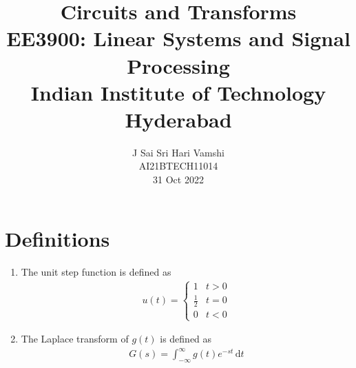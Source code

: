 \documentclass[journal,12pt,twocolumn]{IEEEtran}
\title{Circuits and Transforms \\ \Large EE3900: Linear Systems and Signal Processing \\ \large Indian Institute of Technology Hyderabad}
\author{J Sai Sri Hari Vamshi \\ \normalsize AI21BTECH11014 \\ \vspace*{20pt} \normalsize 31 Oct 2022}
\providecommand{\der}[1]{\mathrm{d} #1}
\numberwithin{equation}{section}
\numberwithin{figure}{section}
\renewcommand\thesection{\arabic{section}}
\begin{document}
	
	\maketitle
	\tableofcontents
	\section{Definitions}
	\begin{enumerate}[label=\thesection.\arabic*,ref=\thesection.\theenumi]
	
		\item The unit step function is defined as
			\begin{align}
				u(t) =
				\begin{cases}
					1 & t > 0 \\
					\frac{1}{2} & t = 0 \\
					0 & t < 0
				\end{cases}
			\end{align}
		
		\item The Laplace transform of $g(t)$ is defined as 
			\begin{align}
				G(s) = \int_{-\infty}^{\infty} g(t) e^{-st}\, \der{t}
			\end{align}
	
	\end{enumerate}
	
\end{document}
